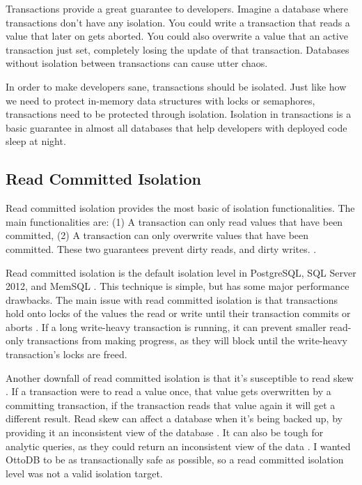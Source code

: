\documentclass[conference]{IEEEtran}
\begin{document}
    Transactions provide a great guarantee to developers. Imagine a database where transactions don’t have any isolation. You could write a transaction that reads a value that later on gets aborted. You could also overwrite a value that an active transaction just set, completely losing the update of that transaction. Databases without isolation between transactions can cause utter chaos. 
    
    In order to make developers sane, transactions should be isolated. Just like how we need to protect in-memory data structures with locks or semaphores, transactions need to be protected through isolation. Isolation in transactions is a basic guarantee in almost all databases that help developers with deployed code sleep at night.

    \subsection{Read Committed Isolation}

    Read committed isolation provides the most basic of isolation functionalities. The main functionalities are: (1) A transaction can only read values that have been committed, (2) A transaction can only overwrite values that have been committed. These two guarantees prevent dirty reads, and dirty writes. \cite[p. 234]{b18}.



    Read committed isolation is the default isolation level in PostgreSQL, SQL Server 2012, and MemSQL \cite[p. 236]{b18}. This technique is simple, but has some major performance drawbacks. The main issue with read committed isolation is that transactions hold onto locks of the values the read or write until their transaction commits or aborts \cite[p. 236]{b18}. If a long write-heavy transaction is running, it can prevent smaller read-only transactions from making progress, as they will block until the write-heavy transaction’s locks are freed.


    Another downfall of read committed isolation is that it’s susceptible to read skew \cite[p. 237]{b18}. If a transaction were to read a value once, that value gets overwritten by a committing transaction, if the transaction reads that value again it will get a different result. Read skew can affect a database when it’s being backed up, by providing it an inconsistent view of the database \cite[p. 237]{b18}. It can also be tough for analytic queries, as they could return an inconsistent view of the data \cite[p. 237]{b18}. I wanted OttoDB to be as transactionally safe as possible, so a read committed isolation level was not a valid isolation target.
\end{document}
